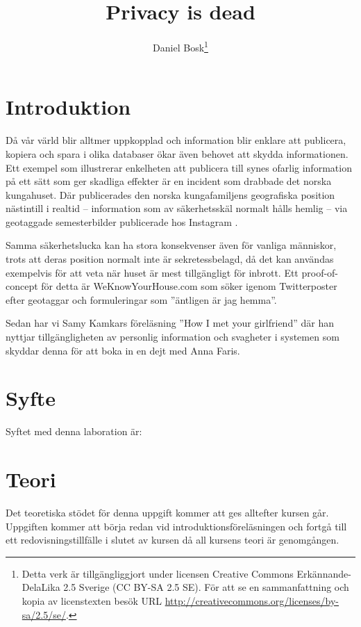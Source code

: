 \documentclass[a4paper,nocourse]{miunasgn}
\title{Privacy is dead}
\author{Daniel Bosk\footnote{%
	Detta verk är tillgängliggjort under licensen Creative Commons 
	Erkännande-DelaLika 2.5 Sverige (CC BY-SA 2.5 SE).
	För att se en sammanfattning och kopia av licenstexten besök URL 
	\url{http://creativecommons.org/licenses/by-sa/2.5/se/}.
}}
\date{\svnId}
\begin{document}
\maketitle
\thispagestyle{foot}
\tableofcontents


\section{Introduktion}
\label{sec:introduction}
\noindent
Då vår värld blir alltmer uppkopplad och information blir enklare att 
publicera, kopiera och spara i olika databaser ökar även behovet att skydda 
informationen.
Ett exempel som illustrerar enkelheten att publicera till synes ofarlig 
information på ett sätt som ger skadliga effekter är en incident som drabbade 
det norska kungahuset.
Där publicerades den norska kungafamiljens geografiska position nästintill 
i realtid -- information som av säkerhetsskäl normalt hålls hemlig -- via 
geotaggade semesterbilder publicerade hos Instagram \cite{Roberts2012wia}.

Samma säkerhetslucka kan ha stora konsekvenser även för vanliga människor, 
trots att deras position normalt inte är sekretessbelagd, då det kan användas 
exempelvis för att veta när huset är mest tillgängligt för inbrott.
Ett proof-of-concept för detta är WeKnowYourHouse.com \cite{Brading2012tpl} som 
söker igenom Twitterposter efter geotaggar och formuleringar som ''äntligen är 
jag hemma''.

Sedan har vi Samy Kamkars föreläsning ''How I met your girlfriend'' 
\cite{Kamkar2010him} där han nyttjar tillgängligheten av personlig information 
och svagheter i systemen som skyddar denna för att boka in en dejt med Anna 
Faris.


\section{Syfte}
\label{sec:aim}
\noindent
Syftet med denna laboration är:
\begin{itemize}
	
\end{itemize}


\section{Teori}
\label{sec:theory}
\noindent
Det teoretiska stödet för denna uppgift kommer att ges alltefter kursen går.
Uppgiften kommer att börja redan vid introduktionsföreläsningen och fortgå till 
ett redovisningstillfälle i slutet av kursen då all kursens teori är 
genomgången.
\end{document}

